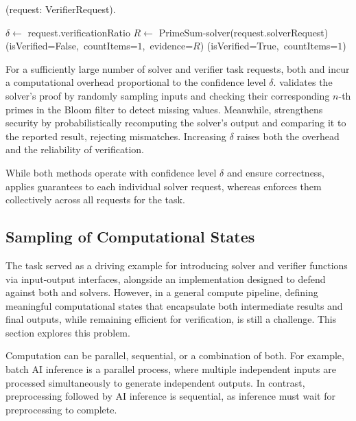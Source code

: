 \documentclass[sigconf, nonacm]{acmart}
\begin{document}
\begin{algorithm}
  \caption{(request: VerifierRequest).}
  \label{alg:primesum-verifier2}
  \begin{algorithmic}[1]
    \STATE $\delta \leftarrow$ \mbox{request.verificationRatio}
    \STATE $R \leftarrow $ \mbox{PrimeSum-solver(request.solverRequest)}
    \RETURN \mbox{(isVerified=False, countItems=$1$, evidence=$R$)}
    \ENDIF
    \ENDIF
    \RETURN \mbox{(isVerified=True, countItems=$1$)}
  \end{algorithmic}
\end{algorithm}

For a sufficiently large number of solver and verifier task requests, both  and  incur a computational overhead proportional to the confidence level $\delta$.  validates the solver’s proof by randomly sampling inputs and checking their corresponding $n$-th primes in the Bloom filter to detect missing values. Meanwhile,  strengthens security by probabilistically recomputing the solver’s output and comparing it to the reported result, rejecting mismatches. Increasing $\delta$ raises both the overhead and the reliability of verification.

While both methods operate with confidence level $\delta$ and ensure correctness,  applies guarantees to each individual solver request, whereas  enforces them collectively across all requests for the task.

\subsection{Sampling of Computational States}
\label{sec:samcomp}

The  task served as a driving example for introducing solver and verifier functions via input-output interfaces, alongside an implementation designed to defend against both  and  solvers. However, in a general compute pipeline, defining meaningful computational states that encapsulate both intermediate results and final outputs, while remaining efficient for verification, is still a challenge. This section explores this problem.

Computation can be parallel, sequential, or a combination of both. For example, batch AI inference is a parallel process, where multiple independent inputs are processed simultaneously to generate independent outputs. In contrast, preprocessing followed by AI inference is sequential, as inference must wait for preprocessing to complete.
\end{document}
